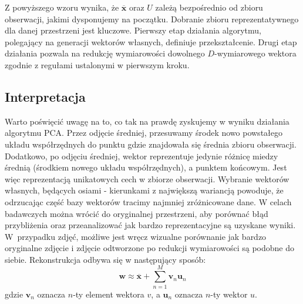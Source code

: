 \documentclass[oneside, eng]{mgr}
\newcommand{\bb}{\textbf}
\begin{document}
Z powyższego wzoru wynika, że $\overline{\bb{x}}$ oraz $U$ zależą bezpośrednio od zbioru obserwacji, jakimi dysponujemy na początku. Dobranie zbioru reprezentatywnego dla danej przestrzeni jest kluczowe. Pierwszy etap działania algorytmu, polegający na generacji wektorów własnych, definiuje przekształcenie. Drugi etap działania pozwala na redukcję wymiarowości dowolnego $D$-wymiarowego wektora zgodnie z regułami ustalonymi w pierwszym kroku.

\subsection{Interpretacja}
Warto poświęcić uwagę na to, co tak na prawdę zyskujemy w wyniku działania algorytmu PCA. Przez odjęcie średniej, przesuwamy środek nowo powstałego układu współrzędnych do punktu gdzie znajdowała się średnia zbioru obserwacji. Dodatkowo, po odjęciu średniej, wektor reprezentuje jedynie różnicę miedzy średnią (środkiem nowego układu współrzędnych), a punktem końcowym. Jest więc reprezentacją unikatowych cech w zbiorze obserwacji. Wybranie wektorów własnych, będących osiami - kierunkami z największą wariancją powoduje, że odrzucając część bazy wektorów tracimy najmniej zróżnicowane dane. W celach badawczych można wrócić do oryginalnej przestrzeni, aby porównać błąd przybliżenia oraz przeanalizować jak bardzo reprezentacyjne są uzyskane wyniki. W~przypadku zdjęć, możliwe jest wręcz wizualne porównanie jak bardzo oryginalne zdjęcie i zdjęcie odtworzone po redukcji wymiarowości są podobne do siebie. Rekonstrukcja odbywa się w następujący sposób:
\begin{equation}
	\bb{w} \approx \overline{\bb{x}} + \sum_{n=1}^{M} \bb{v}_n \bb{u}_n
\end{equation}
gdzie $\bb{v}_n$ oznacza $n$-ty element wektora $v$, a $\bb{u}_n$ oznacza $n$-ty wektor $u$.
\end{document}
